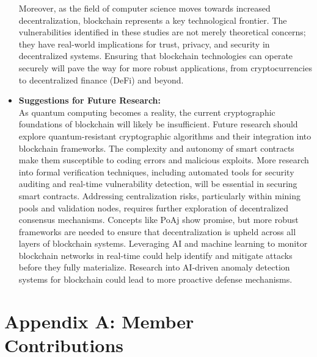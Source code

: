 \documentclass[12pt,a4paper]{article}
\begin{document}
\begin{itemize}
Moreover, as the field of computer science moves towards increased decentralization, blockchain represents a key technological frontier. The vulnerabilities identified in these studies are not merely theoretical concerns; they have real-world implications for trust, privacy, and security in decentralized systems. Ensuring that blockchain technologies can operate securely will pave the way for more robust applications, from cryptocurrencies to decentralized finance (DeFi) and beyond.
    \item \textbf{Suggestions for Future Research:} \\
As quantum computing becomes a reality, the current cryptographic foundations of blockchain will likely be insufficient. Future research should explore quantum-resistant cryptographic algorithms and their integration into blockchain frameworks. The complexity and autonomy of smart contracts make them susceptible to coding errors and malicious exploits. More research into formal verification techniques, including automated tools for security auditing and real-time vulnerability detection, will be essential in securing smart contracts. Addressing centralization risks, particularly within mining pools and validation nodes, requires further exploration of decentralized consensus mechanisms. Concepts like PoAj show promise, but more robust frameworks are needed to ensure that decentralization is upheld across all layers of blockchain systems. Leveraging AI and machine learning to monitor blockchain networks in real-time could help identify and mitigate attacks before they fully materialize. Research into AI-driven anomaly detection systems for blockchain could lead to more proactive defense mechanisms.
\end{itemize}

\newpage




\appendix
\section{Appendix A: Member Contributions}
\end{document}
